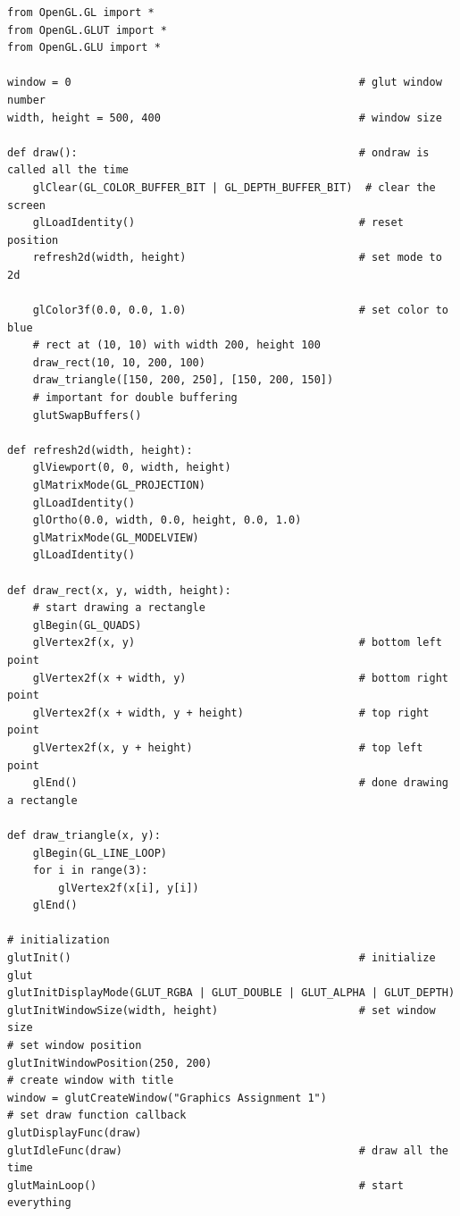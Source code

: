 \documentclass[a4paper, 11pt]{article}
\begin{document}
\begin{lstlisting}
from OpenGL.GL import *
from OpenGL.GLUT import *
from OpenGL.GLU import *

window = 0                                             # glut window number
width, height = 500, 400                               # window size

def draw():                                            # ondraw is called all the time
    glClear(GL_COLOR_BUFFER_BIT | GL_DEPTH_BUFFER_BIT)  # clear the screen
    glLoadIdentity()                                   # reset position
    refresh2d(width, height)                           # set mode to 2d

    glColor3f(0.0, 0.0, 1.0)                           # set color to blue
    # rect at (10, 10) with width 200, height 100
    draw_rect(10, 10, 200, 100)
    draw_triangle([150, 200, 250], [150, 200, 150])
    # important for double buffering
    glutSwapBuffers()

def refresh2d(width, height):
    glViewport(0, 0, width, height)
    glMatrixMode(GL_PROJECTION)
    glLoadIdentity()
    glOrtho(0.0, width, 0.0, height, 0.0, 1.0)
    glMatrixMode(GL_MODELVIEW)
    glLoadIdentity()

def draw_rect(x, y, width, height):
    # start drawing a rectangle
    glBegin(GL_QUADS)
    glVertex2f(x, y)                                   # bottom left point
    glVertex2f(x + width, y)                           # bottom right point
    glVertex2f(x + width, y + height)                  # top right point
    glVertex2f(x, y + height)                          # top left point
    glEnd()                                            # done drawing a rectangle

def draw_triangle(x, y):
    glBegin(GL_LINE_LOOP)
    for i in range(3):
        glVertex2f(x[i], y[i])
    glEnd()

# initialization
glutInit()                                             # initialize glut
glutInitDisplayMode(GLUT_RGBA | GLUT_DOUBLE | GLUT_ALPHA | GLUT_DEPTH)
glutInitWindowSize(width, height)                      # set window size
# set window position
glutInitWindowPosition(250, 200)
# create window with title
window = glutCreateWindow("Graphics Assignment 1")
# set draw function callback
glutDisplayFunc(draw)
glutIdleFunc(draw)                                     # draw all the time
glutMainLoop()                                         # start everything
\end{lstlisting}
\end{document}
